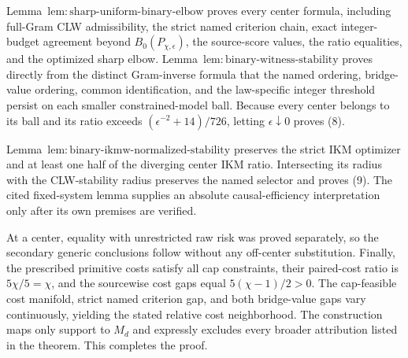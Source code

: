 Lemma~\(\mathrm{lem{:}sharp\text{-}uniform\text{-}binary\text{-}elbow}\) proves every center formula, including full-Gram CLW admissibility, the strict named criterion chain, exact integer-budget agreement beyond \(B_0(P_{\chi,\epsilon})\), the source-score values, the ratio equalities, and the optimized sharp elbow. Lemma~\(\mathrm{lem{:}binary\text{-}witness\text{-}stability}\) proves directly from the distinct Gram-inverse formula that the named ordering, bridge-value ordering, common identification, and the law-specific integer threshold persist on each smaller constrained-model ball. Because every center belongs to its ball and its ratio exceeds \((\epsilon^{-2}+14)/726\), letting \(\epsilon\downarrow0\) proves (8).

Lemma~\(\mathrm{lem{:}binary\text{-}ikmw\text{-}normalized\text{-}stability}\) preserves the strict IKM optimizer and at least one half of the diverging center IKM ratio. Intersecting its radius with the CLW-stability radius preserves the named selector and proves (9). The cited fixed-system lemma supplies an absolute causal-efficiency interpretation only after its own premises are verified.

At a center, equality with unrestricted raw risk was proved separately, so the secondary generic conclusions follow without any off-center substitution. Finally, the prescribed primitive costs satisfy all cap constraints, their paired-cost ratio is \(5\chi/5=\chi\), and the sourcewise cost gaps equal \(5(\chi-1)/2>0\). The cap-feasible cost manifold, strict named criterion gap, and both bridge-value gaps vary continuously, yielding the stated relative cost neighborhood. The construction maps only support to \(M_d\) and expressly excludes every broader attribution listed in the theorem. This completes the proof.